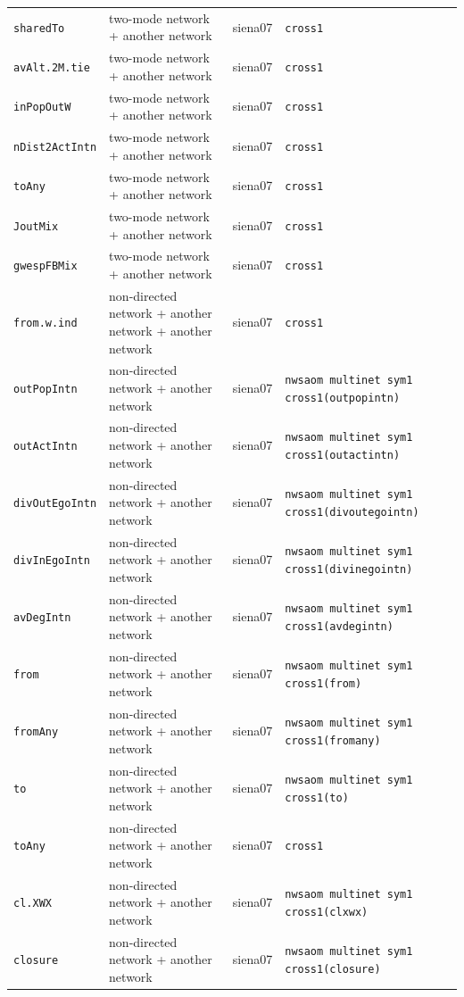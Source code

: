 \begin{longtable}{@{}p{2.6cm}p{3.2cm}p{2.9cm}p{5.4cm}@{}}
\texttt{sharedTo} & two-mode network + another network & siena07 & \texttt{cross1}\\
\texttt{avAlt.2M.tie} & two-mode network + another network & siena07 & \texttt{cross1}\\
\texttt{inPopOutW} & two-mode network + another network & siena07 & \texttt{cross1}\\
\texttt{nDist2ActIntn} & two-mode network + another network & siena07 & \texttt{cross1}\\
\texttt{toAny} & two-mode network + another network & siena07 & \texttt{cross1}\\
\texttt{JoutMix} & two-mode network + another network & siena07 & \texttt{cross1}\\
\texttt{gwespFBMix} & two-mode network + another network & siena07 & \texttt{cross1}\\
\texttt{from.w.ind} & non-directed network + another network + another network & siena07 & \texttt{cross1}\\
\texttt{outPopIntn} & non-directed network + another network & siena07 & \texttt{nwsaom multinet sym1 cross1(outpopintn)}\\
\texttt{outActIntn} & non-directed network + another network & siena07 & \texttt{nwsaom multinet sym1 cross1(outactintn)}\\
\texttt{divOutEgoIntn} & non-directed network + another network & siena07 & \texttt{nwsaom multinet sym1 cross1(divoutegointn)}\\
\texttt{divInEgoIntn} & non-directed network + another network & siena07 & \texttt{nwsaom multinet sym1 cross1(divinegointn)}\\
\texttt{avDegIntn} & non-directed network + another network & siena07 & \texttt{nwsaom multinet sym1 cross1(avdegintn)}\\
\texttt{from} & non-directed network + another network & siena07 & \texttt{nwsaom multinet sym1 cross1(from)}\\
\texttt{fromAny} & non-directed network + another network & siena07 & \texttt{nwsaom multinet sym1 cross1(fromany)}\\
\texttt{to} & non-directed network + another network & siena07 & \texttt{nwsaom multinet sym1 cross1(to)}\\
\texttt{toAny} & non-directed network + another network & siena07 & \texttt{cross1}\\
\texttt{cl.XWX} & non-directed network + another network & siena07 & \texttt{nwsaom multinet sym1 cross1(clxwx)}\\
\texttt{closure} & non-directed network + another network & siena07 & \texttt{nwsaom multinet sym1 cross1(closure)}\\

\end{longtable}
